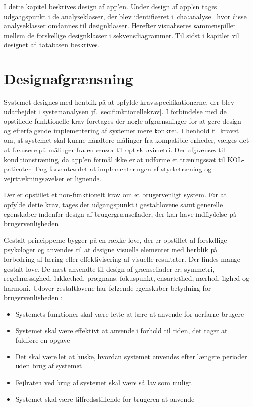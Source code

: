 I dette kapitel beskrives design af app'en. Under design af app'en tages udgangspunkt i de analyseklasser, der blev identificeret i \autoref{cha:analyse}, hvor disse analyseklasser omdannes til designklasser. Herefter visualiseres sammenspillet mellem de forskellige designklasser i sekvensdiagrammer. Til sidst i kapitlet vil designet af databasen beskrives.

\section{Designafgrænsning}
Systemet designes med henblik på at opfylde kravsspecifikationerne, der blev udarbejdet i systemanalysen jf. \autoref{sec:funktionellekrav}. I forbindelse med de opstillede funktionelle krav foretages der nogle afgrænsninger for at gøre design og efterfølgende implementering af systemet mere konkret. I henhold til kravet om, at systemet skal kunne håndtere målinger fra kompatible enheder, vælges det at fokusere på målinger fra en sensor til optisk oximetri. Der afgrænses til konditionstræning, da app'en formål ikke er at udforme et træningssæt til KOL-patienter. Dog forventes det at implementeringen af styrketræning og vejrtrækningsøvelser er lignende. 

Der er opstillet et non-funktionelt krav om et brugervenligt system. For at opfylde dette krav, tages der udgangspunkt i gestaltlovene samt generelle egenskaber indenfor design af brugergrænseflader, der kan have indflydelse på brugervenligheden. 

Gestalt principperne bygger på en række love, der er opstillet af forskellige psykologer og anvendes til at designe visuelle elementer med henblik på forbedring af læring eller effektivisering af visuelle resultater. Der findes mange gestalt love. De mest anvendte til design af grænseflader er; symmetri, regelmæssighed, lukkethed, prægnans, fokuspunkt, ensartethed, nærhed, lighed og harmoni.\cite{Chang2002} Udover gestaltlovene har følgende egenskaber betydning for brugervenligheden \cite{ferre2001}:
\begin{itemize}
\item Systemets funktioner skal være lette at lære at anvende for uerfarne brugere
\item Systemet skal være effektivt at anvende i forhold til tiden, det tager at fuldføre en opgave
\item Det skal være let at huske, hvordan systemet anvendes efter længere perioder uden brug af systemet
\item Fejlraten ved brug af systemet skal være så lav som muligt
\item Systemet skal være tilfredsstillende for brugeren at anvende
\end{itemize}
 

 





